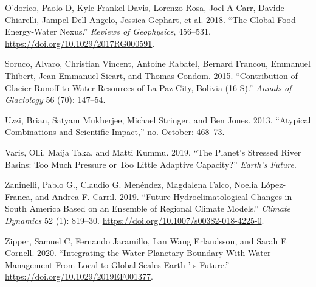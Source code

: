 \documentclass[]{article}
\begin{document}
\leavevmode\hypertarget{ref-Odorico2018}{}%
O'dorico, Paolo D, Kyle Frankel Davis, Lorenzo Rosa, Joel A Carr, Davide
Chiarelli, Jampel Dell Angelo, Jessica Gephart, et al. 2018. ``The
Global Food-Energy-Water Nexus.'' \emph{Reviews of Geophysics},
456--531. \url{https://doi.org/10.1029/2017RG000591}.

\leavevmode\hypertarget{ref-Soruco2015}{}%
Soruco, Alvaro, Christian Vincent, Antoine Rabatel, Bernard Francou,
Emmanuel Thibert, Jean Emmanuel Sicart, and Thomas Condom. 2015.
``Contribution of Glacier Runoff to Water Resources of La Paz City,
Bolivia (16 S).'' \emph{Annals of Glaciology} 56 (70): 147--54.

\leavevmode\hypertarget{ref-Uzzi2013}{}%
Uzzi, Brian, Satyam Mukherjee, Michael Stringer, and Ben Jones. 2013.
``Atypical Combinations and Scientific Impact,'' no. October: 468--73.

\leavevmode\hypertarget{ref-Varis2019}{}%
Varis, Olli, Maija Taka, and Matti Kummu. 2019. ``The Planet's Stressed
River Basins: Too Much Pressure or Too Little Adaptive Capacity?''
\emph{Earth's Future}.

\leavevmode\hypertarget{ref-Zaninelli2019}{}%
Zaninelli, Pablo G., Claudio G. Menéndez, Magdalena Falco, Noelia
López-Franca, and Andrea F. Carril. 2019. ``Future Hydroclimatological
Changes in South America Based on an Ensemble of Regional Climate
Models.'' \emph{Climate Dynamics} 52 (1): 819--30.
\url{https://doi.org/10.1007/s00382-018-4225-0}.

\leavevmode\hypertarget{ref-Zipper2020}{}%
Zipper, Samuel C, Fernando Jaramillo, Lan Wang Erlandsson, and Sarah E
Cornell. 2020. ``Integrating the Water Planetary Boundary With Water
Management From Local to Global Scales Earth ' s Future.''
\url{https://doi.org/10.1029/2019EF001377}.
\end{document}
